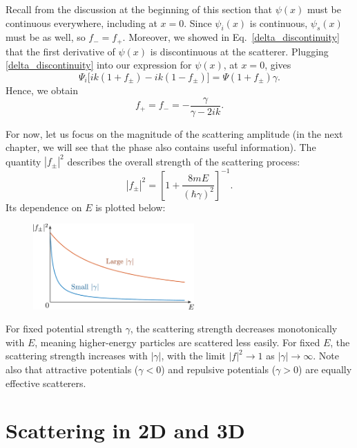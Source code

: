 \documentclass[pra,12pt]{revtex4}
\begin{document}
Recall from the discussion at the beginning of this section that
$\psi(x)$ must be continuous everywhere, including at $x = 0$.  Since
$\psi_i(x)$ is continuous, $\psi_s(x)$ must be as well, so $f_- =
f_+$.  Moreover, we showed in Eq.~\eqref{delta_discontinuity} that the
first derivative of $\psi(x)$ is discontinuous at the scatterer.
Plugging \eqref{delta_discontinuity} into our expression for
$\psi(x)$, at $x = 0$, gives
\begin{equation}
  \Psi_i\big[ik(1+f_\pm) - ik(1-f_\pm)\big] =  \Psi(1+f_\pm) \gamma.
\end{equation}
Hence, we obtain
\begin{equation}
  f_+ = f_- = -\frac{\gamma}{\gamma - 2ik}.
\end{equation}

For now, let us focus on the magnitude of the scattering amplitude (in
the next chapter, we will see that the phase also contains useful
information).  The quantity $|f_\pm|^2$ describes the overall strength
of the scattering process:
\begin{equation}
  |f_\pm|^2 = \left[1 + \frac{8mE}{(\hbar\gamma)^2}\right]^{-1}.
\end{equation}
Its dependence on $E$ is plotted below:

\begin{figure}[h]
  \centering\includegraphics[width=0.55\textwidth]{scattering1df}
\end{figure}

\noindent
For fixed potential strength $\gamma$, the scattering strength
decreases monotonically with $E$, meaning higher-energy particles are
scattered less easily.  For fixed $E$, the scattering strength
increases with $|\gamma|$, with the limit $|f|^2 \rightarrow 1$ as
$|\gamma|\rightarrow \infty$.  Note also that attractive potentials
($\gamma < 0$) and repulsive potentials ($\gamma > 0$) are equally
effective scatterers.

\section{Scattering in 2D and 3D}
\label{sec:2d3d_scattering}
\end{document}
